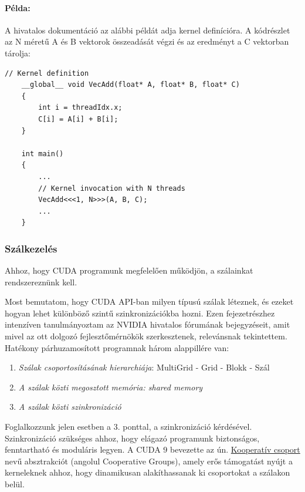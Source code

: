 \paragraph{Példa:} A hivatalos dokumentáció az alábbi példát adja kernel definícióra. A kódrészlet az N méretű A és B vektorok összeadását végzi és az eredményt a C vektorban tárolja:

\begin{lstlisting}[style=CStyle]
	// Kernel definition
	__global__ void VecAdd(float* A, float* B, float* C)
	{
		int i = threadIdx.x;
		C[i] = A[i] + B[i];
	}
	
	int main()
	{
		...
		// Kernel invocation with N threads
		VecAdd<<<1, N>>>(A, B, C);
		...
	}
\end{lstlisting}

\subsubsection{Szálkezelés}
Ahhoz, hogy CUDA programunk megfelelően működjön, a szálainkat rendszereznünk kell. 

Most bemutatom, hogy CUDA API-ban milyen típusú szálak léteznek, és ezeket hogyan lehet különböző szintű szinkronizációkba hozni. Ezen fejezetrészhez intenzíven tanulmányoztam az NVIDIA hivatalos fórumának bejegyzéseit, amit mivel az ott dolgozó fejlesztőmérnökök szerkesztenek, relevánsnak tekintettem. \cite{CUDAcoopgroups}
\newline{}
Hatékony párhuzamosított programnak három alappillére van: \cite{kvantum_optim}
\begin{enumerate}
	\item \emph{Szálak csoportosításának hierarchiája}: MultiGrid - Grid - Blokk - Szál
	\item \emph{A szálak közti megosztott memória: shared memory}
	\item \emph{A szálak közti szinkronizáció}
\end{enumerate}
Foglalkozzunk jelen esetben a 3. ponttal, a szinkronizáció kérdésével. Szinkronizáció szükséges ahhoz, hogy elágazó programunk biztonságos, fenntartható és moduláris legyen. A CUDA 9 bevezette az ún. \href{https://docs.nvidia.com/cuda/cuda-c-programming-guide/index.html#cooperative-groups}{Kooperatív csoport } nevű absztrakciót (angolul Cooperative Groups), amely erős támogatást nyújt a kerneleknek ahhoz, hogy dinamikusan alakíthassanak ki csoportokat a szálakon belül.

